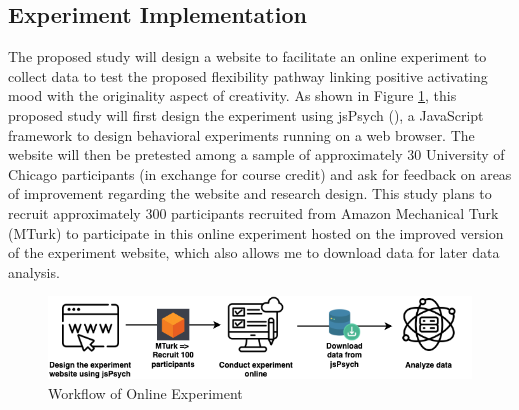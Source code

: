 \documentclass[../Proposal.tex]{subfiles}
\begin{document}
\subsection*{Experiment Implementation}
The proposed study will design a website to facilitate an online experiment to collect data to test the proposed flexibility pathway linking positive activating mood with the originality aspect of creativity. As shown in Figure \ref{fig: Workflow of Online Experiment}, this proposed study will first design the experiment using jsPsych (\cite{leeuw_jspsych_2023}), a JavaScript framework to design behavioral experiments running on a web browser. The website will then be pretested among a sample of approximately 30 University of Chicago participants (in exchange for course credit) and ask for feedback on areas of improvement regarding the website and research design. This study plans to recruit approximately 300 participants recruited from Amazon Mechanical Turk (MTurk) to participate in this online experiment hosted on the improved version of the experiment website, which also allows me to download data for later data analysis.

\begin{figure}
    \centering
    \includegraphics[width=0.8\linewidth, keepaspectratio]{drawio/Workflow.png}
    \caption{Workflow of Online Experiment}
    \label{fig: Workflow of Online Experiment}
\end{figure}
\end{document}
